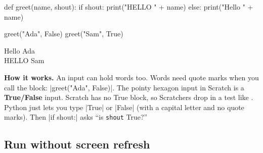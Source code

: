\begin{tcbraster}[raster columns=2, raster equal height=rows, raster column skip=12pt, raster valign=center, raster force size=false, raster column 1/.style={add to width=-2cm}, raster column 2/.style={add to width=2cm}]
\begin{tcolorbox}[colback=white, colframe=white, boxrule=0pt, valign=center]
\begin{scratch}
\end{scratch}
\par\medskip
\begin{scratch}
\end{scratch}
\end{tcolorbox}
\begin{code}
def greet(name, shout):
    if shout:
        print("HELLO " + name)
    else:
        print("Hello " + name)

greet("Ada", False)
greet("Sam", True)
\end{code}
\end{tcbraster}

\begin{outputbox}
Hello Ada\\
HELLO Sam
\end{outputbox}

\textbf{How it works.} An input can hold words too. Words need quote marks when you call the block: \py|greet("Ada", False)|. The pointy hexagon input in Scratch is a \textbf{True/False} input. Scratch has no True block, so Scratchers drop in a test like . Python just lets you type \py|True| or \py|False| (with a capital letter and no quote marks). Then \py|if shout:| asks ``is \texttt{shout} True?''

\subsection*{Run without screen refresh}

